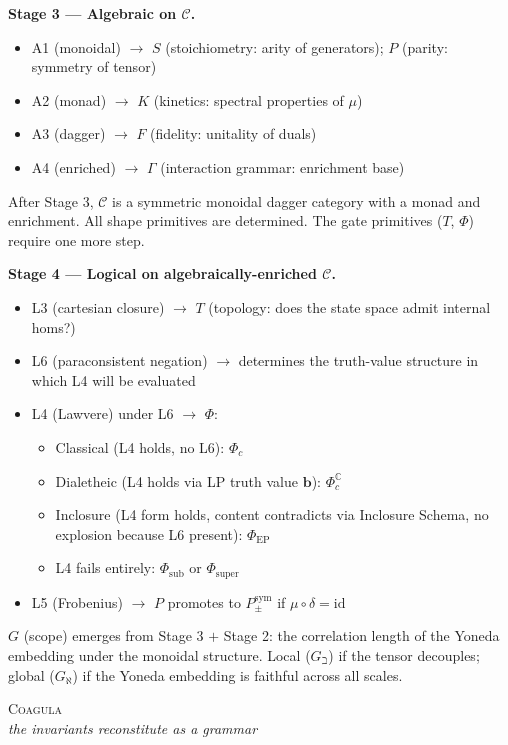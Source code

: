 \documentclass[12pt,a4paper]{article}
\begin{document}
\medskip
\noindent\textbf{Stage 3 --- Algebraic on $\mathcal{C}$.}
\begin{itemize}[nosep, leftmargin=2em]
  \item A1 (monoidal) $\to$ $S$ (stoichiometry: arity of generators); $P$ (parity: symmetry of tensor)
  \item A2 (monad) $\to$ $K$ (kinetics: spectral properties of $\mu$)
  \item A3 (dagger) $\to$ $F$ (fidelity: unitality of duals)
  \item A4 (enriched) $\to$ $\Gamma$ (interaction grammar: enrichment base)
\end{itemize}
After Stage 3, $\mathcal{C}$ is a symmetric monoidal dagger category with a monad and enrichment. All shape primitives are determined. The gate primitives ($T$, $\Phi$) require one more step.

\medskip
\noindent\textbf{Stage 4 --- Logical on algebraically-enriched $\mathcal{C}$.}
\begin{itemize}[nosep, leftmargin=2em]
  \item L3 (cartesian closure) $\to$ $T$ (topology: does the state space admit internal homs?)
  \item L6 (paraconsistent negation) $\to$ determines the truth-value structure in which L4 will be evaluated
  \item L4 (Lawvere) under L6 $\to$ $\Phi$:
  \begin{itemize}[nosep, leftmargin=2em]
    \item Classical (L4 holds, no L6): $\Phi_c$
    \item Dialetheic (L4 holds via LP truth value $\mathbf{b}$): $\Phi_c^\mathbb{C}$
    \item Inclosure (L4 form holds, content contradicts via Inclosure Schema, no explosion because L6 present): $\Phi_\text{EP}$
    \item L4 fails entirely: $\Phi_\text{sub}$ or $\Phi_\text{super}$
  \end{itemize}
  \item L5 (Frobenius) $\to$ $P$ promotes to $P_{\pm}^{\text{sym}}$ if $\mu \circ \delta = \text{id}$
\end{itemize}
$G$ (scope) emerges from Stage 3 $+$ Stage 2: the correlation length of the Yoneda embedding under the monoidal structure. Local ($G_\beth$) if the tensor decouples; global ($G_\aleph$) if the Yoneda embedding is faithful across all scales.

\begin{center}
\vspace{0.6em}
{\large\textsc{Coagula}}\\[4pt]
{\small\itshape the invariants reconstitute as a grammar}
\vspace{0.4em}
\end{center}
\end{document}
